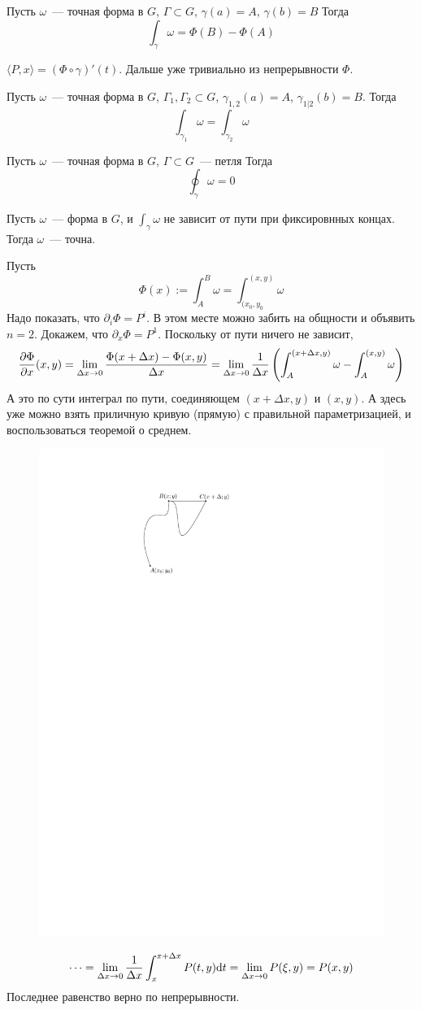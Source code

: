 \documentclass[12pt,timbord]{../../../notes}
\begin{document}
\begin{thrm}\label{thrm:lineint::precforms::precint}
  Пусть $\omega$~--- точная форма в  $G$, $\Gamma \subset G$, $\gamma(a)=A$, $\gamma(b)=B$
  Тогда
  \[
    \int_\gamma \omega = \Phi(B) - \Phi(A)
  \]
\end{thrm}
\begin{ittproof}
  $\langle P, x \rangle = (\Phi \circ \gamma)' (t)$. Дальше уже тривиально из непрерывности
  $\Phi$.
\end{ittproof}

\begin{thrm}\label{thrm:lineint::precforms::precint2}
  Пусть $\omega$~--- точная форма в  $G$, $\Gamma_1, \Gamma_2 \subset G$,
  $\gamma_{1,2}(a)=A$, $\gamma_{1|2}(b)=B$.
  Тогда
  \[
    \int_{\gamma_1} \omega  = \int_{\gamma_2} \omega 
  \]
\end{thrm}

\begin{thrm}\label{thrm:lineint::precforms::loopint}
  Пусть $\omega$~--- точная форма в  $G$, $\Gamma \subset G$~--- петля
  Тогда
  \[
    \oint_\gamma \omega = 0
  \]
\end{thrm}

\begin{thrm}\label{thrm:lineint::precforms::critprec}
  Пусть $\omega$~--- форма в  $G$, и $\int_\gamma \omega $ не зависит от пути при фиксировнных
  концах. Тогда $\omega$~--- точна.
\end{thrm}

\begin{ittproof}
  Пусть 
  \[
    \Phi(x) := \int_A^B \omega = \int_{(x_0, y_0}^{(x,y)} \omega
  \]
  Надо показать, что $\partial_i \Phi = P^i$. В этом месте можно забить на общности и объявить
  $n=2$. 
  Докажем, что $\partial_x \Phi = P^1$. Поскольку от пути ничего не зависит,
  \[
    \frac{\partial \Phi}{\partial x}(x,y) = \lim_{\Delta x\to 0}\frac{\Phi(x+\Delta x)- \Phi(x,y)}{\Delta x} = 
    \lim_{\Delta x\to 0} \frac{1}{\Delta x} \left(\int_A^{{(x+\Delta x,y)}} \omega - 
    \int_A^{(x,y)} \omega\right)
  \]
  А это по сути интеграл по пути, соединяющем $(x+\Delta x, y)$ и $(x, y)$. А здесь уже можно
  взять приличную кривую (прямую) с правильной параметризацией, и воспользоваться теоремой о
  среднем.
  \begin{figure}[h]
    \centering
    \includegraphics[width=0.3\linewidth]{precformcrit}
  \end{figure}
  \[
    \cdots = \lim_{\Delta x \to 0} \frac{1}{\Delta x} \int_{x}^{x+\Delta x} P(t, y) \mathrm{d} t = 
    \lim_{\Delta x \to 0} P(\xi, y) = P(x,y)
  \]
  Последнее равенство верно по непрерывности.
\end{ittproof}
\end{document}
